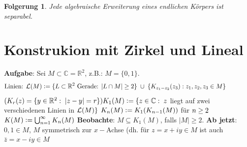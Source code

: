 \documentclass[a4paper,10pt,german]{scrbook}
\theoremstyle{saetze}
\theoremstyle{definitionen}
\newtheorem{Folg}[Def]{Folgerung}
\begin{document}
\begin{Folg}
Jede algebraische Erweiterung eines
endlichen Körpers ist separabel.

\end{Folg}

\section{Konstrukion mit Zirkel und Lineal}

\textbf{Aufgabe}: Sei $M \subset \mathbb{C} = \mathbb{R}^2$, z.B.:
$M=\{0,1\}$.
\[\mbox{Linien: }\mathcal{L}(M) \mathrel{\mathop:}= \{L \subset \mathbb{R}^2 \mbox{ Gerade: }
|L \cap M| \geq 2\}\; \cup \;\{K_{z_1 - z_2}(z_3): z_1, z_2, z_3
\in M\}\qquad\qquad\] $(K_r(z) = \{y \in \mathbb{R}^2:\;|z-y| =
r\}) \\\\ K_1(M) \mathrel{\mathop:}= \{z \in \mathbb{C}:\; z$ liegt auf zwei
verschiedenen Linien in $\mathcal{L}(M)\}\\$ $K_n(M) \mathrel{\mathop:}=
K_1(K_{n-1}(M))$ für $n \geq 2\\$ $K(M) \mathrel{\mathop:}= \bigcup_{n=1}^\infty
K_n(M)$
\newline\newline\textbf{Beobachte}: $M \subseteq K_1(M)$,
falls $|M| \geq 2$.
\newline \textbf{Ab jetzt}: $0,1 \in M$, $M$ symmetrisch zur $x-$Achse (dh.
für $z = x+iy \in M$ ist auch $\bar z = x -iy \in M$
\end{document}
